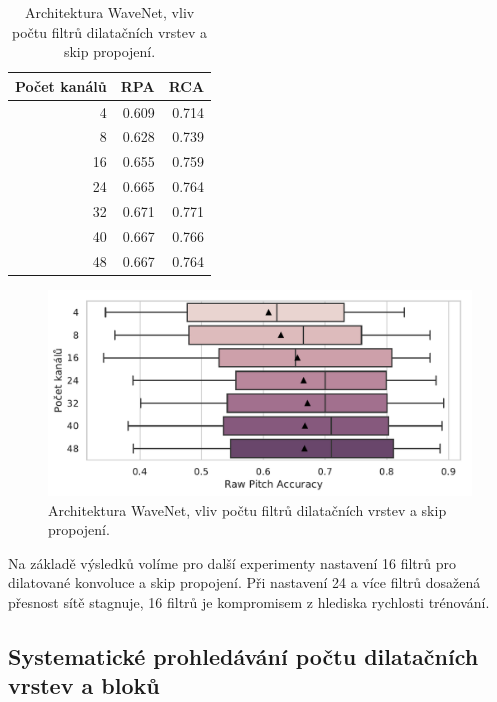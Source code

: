 \begin{table}[h!]
\centering
    \begin{tabular}{rrr}
    \toprule
    Počet kanálů &   RPA &   RCA \\
    \midrule
            4 & 0.609 & 0.714 \\
            8 & 0.628 & 0.739 \\
            16 & 0.655 & 0.759 \\
            24 & 0.665 & 0.764 \\
            32 & 0.671 & 0.771 \\
            40 & 0.667 & 0.766 \\
            48 & 0.667 & 0.764 \\
    \bottomrule
    \end{tabular}

\caption{Architektura WaveNet, vliv počtu filtrů dilatačních vrstev a skip propojení.}\label{tab:wavenet_dil_skip_channels}
\end{table}

\begin{figure}[h]\centering
    \includegraphics[scale=0.6]{../img/figures/wavenet_dil_skip_channels.pdf}
\caption{Architektura WaveNet, vliv počtu filtrů dilatačních vrstev a skip propojení.}\label{obr:wavenet_dil_skip_channels}
\end{figure}

Na základě výsledků volíme pro další experimenty nastavení 16 filtrů pro dilatované konvoluce a skip propojení. Při nastavení 24 a více filtrů dosažená přesnost sítě stagnuje, 16 filtrů je kompromisem z hlediska rychlosti trénování.

\subsection{Systematické prohledávání počtu dilatačních vrstev a bloků}

